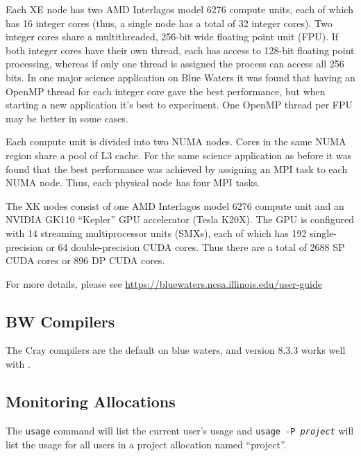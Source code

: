 Each XE node has two AMD Interlagos model 6276 compute units, each of
which has 16 integer cores (thus, a single node has a total of 32 integer
cores).  Two integer cores share a multithreaded, 256-bit wide floating 
point unit (FPU).  If both integer cores have their own thread, each has access 
to 128-bit floating point processing, whereas if only one thread is 
assigned the process can access all 256 bits.  In one major science
application on Blue Waters it was found that having an OpenMP thread for
each integer core gave the best performance, but when starting a new
application it's best to experiment.  One OpenMP thread per FPU may
be better in some cases.

Each compute unit is divided into two NUMA nodes.  Cores in
the same NUMA region share a pool of L3 cache.  For the same science
application as before it was found that the best performance was achieved
by assigning an MPI task to each NUMA node.  Thus, each physical node
has four MPI tasks.

The XK nodes consist of one AMD Interlagos model 6276 compute unit
and an NVIDIA GK110 ``Kepler'' GPU accelerator (Tesla K20X).  The
GPU is configured with 14 streaming multiprocessor units (SMXs), each
of which has 192 single-precision or 64 double-precision CUDA cores.  Thus
there are a total of 2688 SP CUDA cores or 896 DP CUDA cores.

For more details, please see 
\url{https://bluewaters.ncsa.illinois.edu/user-guide}

\subsection{BW Compilers}

The Cray compilers are the default on blue waters, and version
8.3.3 works well with \maestro.

\subsection{Monitoring Allocations}

The {\tt usage} command will list the current user's usage and 
{\tt usage -P {\em project}} will
list the usage for all users in a project allocation named ``project''.
